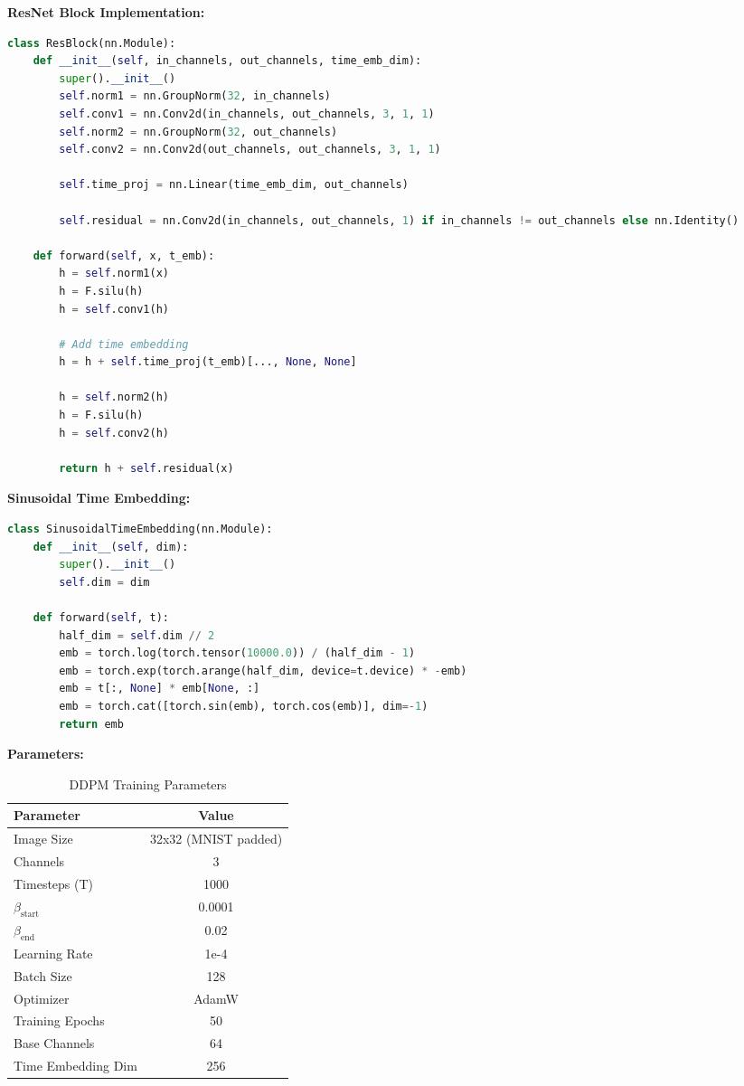 \documentclass[a4paper,12pt]{article}
\begin{document}
\textbf{ResNet Block Implementation:}
\begin{lstlisting}[language=Python]
class ResBlock(nn.Module):
    def __init__(self, in_channels, out_channels, time_emb_dim):
        super().__init__()
        self.norm1 = nn.GroupNorm(32, in_channels)
        self.conv1 = nn.Conv2d(in_channels, out_channels, 3, 1, 1)
        self.norm2 = nn.GroupNorm(32, out_channels)
        self.conv2 = nn.Conv2d(out_channels, out_channels, 3, 1, 1)
        
        self.time_proj = nn.Linear(time_emb_dim, out_channels)
        
        self.residual = nn.Conv2d(in_channels, out_channels, 1) if in_channels != out_channels else nn.Identity()
    
    def forward(self, x, t_emb):
        h = self.norm1(x)
        h = F.silu(h)
        h = self.conv1(h)
        
        # Add time embedding
        h = h + self.time_proj(t_emb)[..., None, None]
        
        h = self.norm2(h)
        h = F.silu(h)
        h = self.conv2(h)
        
        return h + self.residual(x)
\end{lstlisting}

\textbf{Sinusoidal Time Embedding:}
\begin{lstlisting}[language=Python]
class SinusoidalTimeEmbedding(nn.Module):
    def __init__(self, dim):
        super().__init__()
        self.dim = dim
    
    def forward(self, t):
        half_dim = self.dim // 2
        emb = torch.log(torch.tensor(10000.0)) / (half_dim - 1)
        emb = torch.exp(torch.arange(half_dim, device=t.device) * -emb)
        emb = t[:, None] * emb[None, :]
        emb = torch.cat([torch.sin(emb), torch.cos(emb)], dim=-1)
        return emb
\end{lstlisting}

\textbf{Parameters:}
\begin{table}[H]
    \centering
    \begin{tabular}{lc}
        \toprule
        \textbf{Parameter} & \textbf{Value} \\
        \midrule
        Image Size & 32x32 (MNIST padded) \\
        Channels & 3 \\
        Timesteps (T) & 1000 \\
        $\beta_{\text{start}}$ & 0.0001 \\
        $\beta_{\text{end}}$ & 0.02 \\
        Learning Rate & 1e-4 \\
        Batch Size & 128 \\
        Optimizer & AdamW \\
        Training Epochs & 50 \\
        Base Channels & 64 \\
        Time Embedding Dim & 256 \\
        \bottomrule
    \end{tabular}
    \caption{DDPM Training Parameters}
\end{table}
\end{document}
